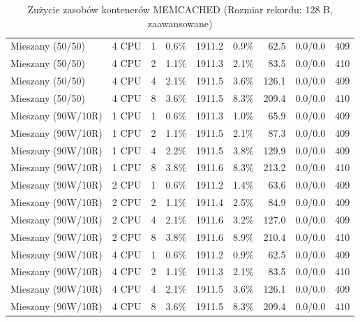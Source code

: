 \begin{table}[ht]
{\begin{tabular}{llcrrrrcc}
Mieszany (50/50) & 4 CPU & 1 & 0.6\% & 1911.2 & 0.9\% & 62.5 & 0.0/0.0 & 409 \\
Mieszany (50/50) & 4 CPU & 2 & 1.1\% & 1911.3 & 2.1\% & 83.5 & 0.0/0.0 & 410 \\
Mieszany (50/50) & 4 CPU & 4 & 2.1\% & 1911.5 & 3.6\% & 126.1 & 0.0/0.0 & 409 \\
Mieszany (50/50) & 4 CPU & 8 & 3.6\% & 1911.5 & 8.3\% & 209.4 & 0.0/0.0 & 410 \\
Mieszany (90W/10R) & 1 CPU & 1 & 0.6\% & 1911.3 & 1.0\% & 65.9 & 0.0/0.0 & 409 \\
Mieszany (90W/10R) & 1 CPU & 2 & 1.1\% & 1911.5 & 2.1\% & 87.3 & 0.0/0.0 & 409 \\
Mieszany (90W/10R) & 1 CPU & 4 & 2.2\% & 1911.5 & 3.8\% & 129.9 & 0.0/0.0 & 409 \\
Mieszany (90W/10R) & 1 CPU & 8 & 3.8\% & 1911.6 & 8.3\% & 213.2 & 0.0/0.0 & 410 \\
Mieszany (90W/10R) & 2 CPU & 1 & 0.6\% & 1911.2 & 1.4\% & 63.6 & 0.0/0.0 & 409 \\
Mieszany (90W/10R) & 2 CPU & 2 & 1.1\% & 1911.4 & 2.5\% & 84.9 & 0.0/0.0 & 409 \\
Mieszany (90W/10R) & 2 CPU & 4 & 2.1\% & 1911.6 & 3.2\% & 127.0 & 0.0/0.0 & 409 \\
Mieszany (90W/10R) & 2 CPU & 8 & 3.8\% & 1911.6 & 8.9\% & 210.4 & 0.0/0.0 & 410 \\
Mieszany (90W/10R) & 4 CPU & 1 & 0.6\% & 1911.2 & 0.9\% & 62.5 & 0.0/0.0 & 409 \\
Mieszany (90W/10R) & 4 CPU & 2 & 1.1\% & 1911.3 & 2.1\% & 83.5 & 0.0/0.0 & 410 \\
Mieszany (90W/10R) & 4 CPU & 4 & 2.1\% & 1911.5 & 3.6\% & 126.1 & 0.0/0.0 & 409 \\
Mieszany (90W/10R) & 4 CPU & 8 & 3.6\% & 1911.5 & 8.3\% & 209.4 & 0.0/0.0 & 410 \\
\bottomrule
\end{tabular}%
}
\caption{Zużycie zasobów kontenerów MEMCACHED (Rozmiar rekordu: 128 B, zaawansowane)}
\label{tab:resources_memcached_small_0}
\end{table}
